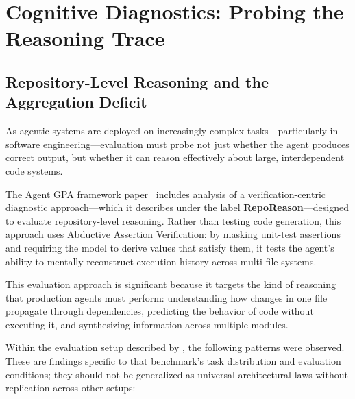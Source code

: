 \section{Cognitive Diagnostics: Probing the Reasoning Trace}
\label{sec:cognitive}

\subsection{Repository-Level Reasoning and the Aggregation Deficit}

As agentic systems are deployed on increasingly complex tasks---particularly in software engineering---evaluation must probe not just whether the agent produces correct output, but whether it can reason effectively about large, interdependent code systems.

The Agent GPA framework paper~\citep{agent_gpa} includes analysis of a verification-centric diagnostic approach---which it describes under the label \textbf{RepoReason}---designed to evaluate repository-level reasoning. Rather than testing code generation, this approach uses Abductive Assertion Verification: by masking unit-test assertions and requiring the model to derive values that satisfy them, it tests the agent's ability to mentally reconstruct execution history across multi-file systems.

This evaluation approach is significant because it targets the kind of reasoning that production agents must perform: understanding how changes in one file propagate through dependencies, predicting the behavior of code without executing it, and synthesizing information across multiple modules.

Within the evaluation setup described by \citet{agent_gpa}, the following patterns were observed. These are findings specific to that benchmark's task distribution and evaluation conditions; they should not be generalized as universal architectural laws without replication across other setups:

